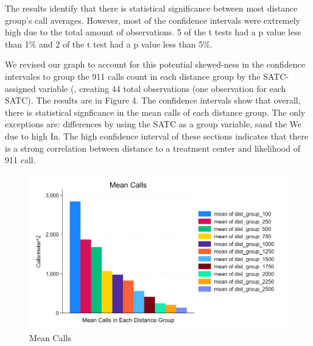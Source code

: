 \documentclass[12pt]{article}
\begin{document}
The results identify that there is statistical significance between most distance group's call averages. However, most of the confidence intervals were extremely high due to the total amount of observations. 5 of the t tests had a p value less than 1\% and 2 of the t test had a p value less than 5\%.  

We revised our graph to account for this potential skewed-ness in the confidence intervales to group the 911 calls count in each distance group by the SATC-assigned variable (, creating 44 total observations (one observation for each SATC). The results are in Figure 4. The confidence intervals show that overall, there is statistical signficance in the mean calls of each distance group. The only exceptions are: differences by using the SATC as a group variable, sand the We due to high In. The high confidence interval of these sections indicates that there is a strong correlation between distance to a treatment center and likelihood of 911 call.

 

\begin{figure}[h]
    \centering
    \includegraphics[width=1\linewidth]{Reproducibility Package//Visual Graphics/Mean Calls.png}
    \caption{Mean Calls}
    \label{fig:enter-label}
\end{figure}
\end{document}
